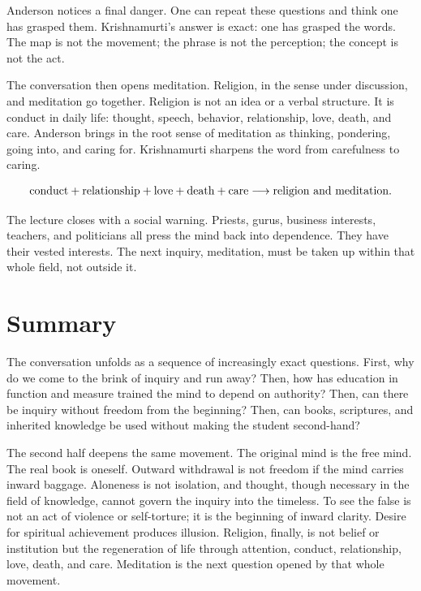 Anderson notices a final danger. One can repeat these questions and think one has grasped them. Krishnamurti's answer is exact: one has grasped the words. The map is not the movement; the phrase is not the perception; the concept is not the act.

The conversation then opens meditation. Religion, in the sense under discussion, and meditation go together. Religion is not an idea or a verbal structure. It is conduct in daily life: thought, speech, behavior, relationship, love, death, and care. Anderson brings in the root sense of meditation as thinking, pondering, going into, and caring for. Krishnamurti sharpens the word from carefulness to caring.

\begin{align}
\hbox{conduct} + \hbox{relationship} + \hbox{love} + \hbox{death} + \hbox{care}
\longrightarrow \hbox{religion and meditation}.
\end{align}

The lecture closes with a social warning. Priests, gurus, business interests, teachers, and politicians all press the mind back into dependence. They have their vested interests. The next inquiry, meditation, must be taken up within that whole field, not outside it.

\section{Summary}

The conversation unfolds as a sequence of increasingly exact questions. First, why do we come to the brink of inquiry and run away? Then, how has education in function and measure trained the mind to depend on authority? Then, can there be inquiry without freedom from the beginning? Then, can books, scriptures, and inherited knowledge be used without making the student second-hand?

The second half deepens the same movement. The original mind is the free mind. The real book is oneself. Outward withdrawal is not freedom if the mind carries inward baggage. Aloneness is not isolation, and thought, though necessary in the field of knowledge, cannot govern the inquiry into the timeless. To see the false is not an act of violence or self-torture; it is the beginning of inward clarity. Desire for spiritual achievement produces illusion. Religion, finally, is not belief or institution but the regeneration of life through attention, conduct, relationship, love, death, and care. Meditation is the next question opened by that whole movement.